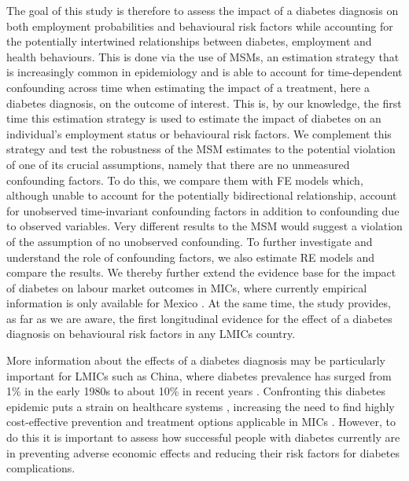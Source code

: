 The goal of this study is therefore to assess the impact of a diabetes diagnosis on both employment probabilities and behavioural risk factors while accounting for the potentially intertwined relationships between diabetes, employment and health behaviours. This is done via the use of \acp{MSM}, an estimation strategy that is increasingly common in epidemiology and is able to account for time-dependent confounding across time \parencite{Robins2000} when estimating the impact of a treatment, here a diabetes diagnosis, on the outcome of interest. This is, by our knowledge, the first time this estimation strategy is used to estimate the impact of diabetes on an individual's employment status or behavioural risk factors. We complement this strategy and test the robustness of the \ac{MSM} estimates to the potential violation of one of its crucial assumptions, namely that there are no unmeasured confounding factors. To do this, we compare them with \ac{FE} models which, although unable to account for the potentially bidirectional relationship, account for unobserved time-invariant confounding factors in addition to confounding due to observed variables. Very different results to the \ac{MSM} would suggest a violation of the assumption of no unobserved confounding. To further investigate and understand the role of confounding factors, we also estimate \ac{RE} models and compare the results.  We thereby further extend the evidence base for the impact of diabetes on labour market outcomes in \acp{MIC}, where currently empirical information is only available for Mexico \parencite{Seuring2016}. At the same time, the study provides, as far as we are aware, the first longitudinal evidence for the effect of a diabetes diagnosis on behavioural risk factors in any \acp{LMIC}  country.

 
More information about the effects of a diabetes diagnosis may be particularly important for \acp{LMIC} such as China, where diabetes prevalence has surged from 1\% in the early 1980s to about 10\% in recent years \autocite{Hu2011,Risk2016}. Confronting this diabetes epidemic puts a strain on healthcare systems \parencite{Seuring2015a}, increasing the need to find highly cost-effective prevention and treatment options applicable in \acp{MIC} \parencite{WHOresearchpriorities2010}. However, to do this it is important to assess how successful people with diabetes currently are in preventing adverse economic effects and reducing their risk factors for diabetes complications.




